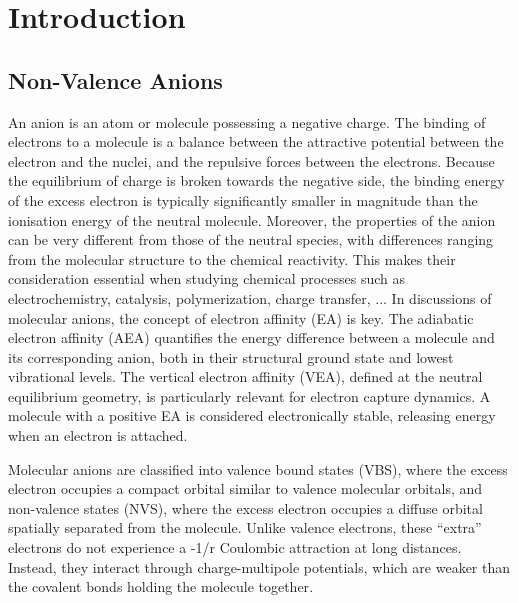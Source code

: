 \chapter{Introduction}\label{ch:introduction}

\section{Non-Valence Anions}
An anion is an atom or molecule possessing a negative charge\cite{simons2008molecular,simons2023molecular,simons2011theoretical,herbert2015quantum}. The binding of electrons to a molecule is a balance between the attractive potential between the electron and the nuclei, and the repulsive forces between the electrons. Because the equilibrium of charge is broken towards the negative side, the binding energy of the excess electron is typically significantly smaller in magnitude than the ionisation energy of the neutral molecule. Moreover, the properties of the anion can be very different from those of the neutral species, with differences ranging from the molecular structure to the chemical reactivity. This makes their consideration essential when studying chemical processes such as electrochemistry, catalysis, polymerization, charge transfer, ... In discussions of molecular anions, the concept of electron affinity (EA) is key. The adiabatic electron affinity (AEA) quantifies the energy difference between a molecule and its corresponding anion, both in their structural ground state and lowest vibrational levels. The vertical electron affinity (VEA), defined at the neutral equilibrium geometry, is particularly relevant for electron capture dynamics. A molecule with a positive EA is considered electronically stable, releasing energy when an electron is attached\cite{simons2008molecular}.

Molecular anions are classified into valence bound states (VBS), where the excess electron occupies a compact orbital similar to valence molecular orbitals, and non-valence states (NVS), where the excess electron occupies a diffuse orbital spatially separated from the molecule. Unlike valence electrons, these ``extra'' electrons do not experience a -1/r Coulombic attraction at long distances. Instead, they interact through charge-multipole potentials, which are weaker than the covalent bonds holding the molecule together\cite{simons2008molecular,herbert2015quantum}.

